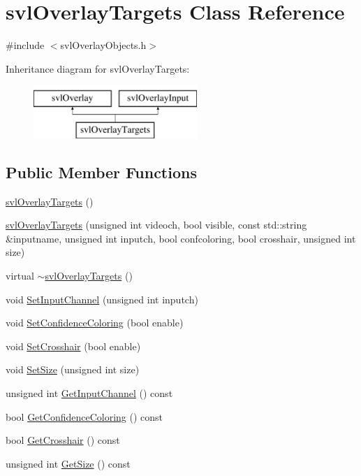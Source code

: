 \hypertarget{classsvl_overlay_targets}{\section{svl\-Overlay\-Targets Class Reference}
\label{classsvl_overlay_targets}
}


{\ttfamily \#include $<$svl\-Overlay\-Objects.\-h$>$}

Inheritance diagram for svl\-Overlay\-Targets\-:\begin{figure}[H]
\begin{center}
\leavevmode
\includegraphics[height=2.000000cm]{de/ddd/classsvl_overlay_targets}
\end{center}
\end{figure}
\subsection*{Public Member Functions}
\begin{DoxyCompactItemize}
\item 
\hyperlink{classsvl_overlay_targets_a6b6e8c9a5cdecb2aad325ea153a31f1b}{svl\-Overlay\-Targets} ()
\item 
\hyperlink{classsvl_overlay_targets_ab078e446f8428b89fae2686e22e52f25}{svl\-Overlay\-Targets} (unsigned int videoch, bool visible, const std\-::string \&inputname, unsigned int inputch, bool confcoloring, bool crosshair, unsigned int size)
\item 
virtual \hyperlink{classsvl_overlay_targets_a9a99f9775bbafd54a56724be23599c00}{$\sim$svl\-Overlay\-Targets} ()
\item 
void \hyperlink{classsvl_overlay_targets_a549e6ce11739afc6acb5ad55c8220c94}{Set\-Input\-Channel} (unsigned int inputch)
\item 
void \hyperlink{classsvl_overlay_targets_a4dd5523a43ab40d1db86a6955f0ff51a}{Set\-Confidence\-Coloring} (bool enable)
\item 
void \hyperlink{classsvl_overlay_targets_a6429a90e95b48aefff5667daec18afa9}{Set\-Crosshair} (bool enable)
\item 
void \hyperlink{classsvl_overlay_targets_a447dd83b868670f5ee69943208f46083}{Set\-Size} (unsigned int size)
\item 
unsigned int \hyperlink{classsvl_overlay_targets_aef9aef75fa0166c7b2de1d29e6b5b9be}{Get\-Input\-Channel} () const 
\item 
bool \hyperlink{classsvl_overlay_targets_a1ae4aea0fdc8b9e5b028496d3507d6da}{Get\-Confidence\-Coloring} () const 
\item 
bool \hyperlink{classsvl_overlay_targets_a44dfc0e2dc64ee4b297f330bc1a5882c}{Get\-Crosshair} () const 
\item 
unsigned int \hyperlink{classsvl_overlay_targets_a639a0cebe0a0a5de5d2541df8db0f195}{Get\-Size} () const 
\end{DoxyCompactItemize}
